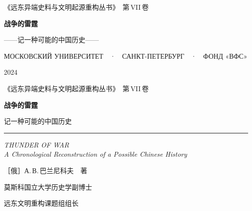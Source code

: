 \clearpage
\makeatletter\@mainmatterfalse\makeatother
{}
\pagestyle{frontmatterpage}

\thispagestyle{empty}
\begingroup
\centering
\vspace*{7mm}

{\sffamily\footnotesize\color{pencil}
《远东异端史料与文明起源重构丛书》\ 第\,VII\,卷\par}

\vspace{27mm}

{\fontsize{26pt}{34pt}\selectfont\bfseries 战争的雷霆\par}
\vspace{8mm}
{\large ——记一种可能的中国历史——\par}

\vfill

{\sffamily\footnotesize\color{pencil}
МОСКОВСКИЙ УНИВЕРСИТЕТ\ \ ·\ \ САНКТ-ПЕТЕРБУРГ\ \ ·\ \ ФОНД «ВФС»\par}
\vspace{4mm}
{\footnotesize\color{pencil} 2024\par}
\endgroup
\clearpage


\thispagestyle{empty}
\begingroup
\centering
\vspace*{3mm}

{\sffamily\footnotesize\color{pencil}
《远东异端史料与文明起源重构丛书》\ 第\,VII\,卷\par}

\vspace{17mm}
{\fontsize{31pt}{40pt}\selectfont\bfseries 战争的雷霆\par}
\vspace{6mm}
{\LARGE 记一种可能的中国历史\par}

\vspace{10mm}
{\color{rulegrey}\rule{46mm}{0.4pt}}
\vspace{10mm}

{\itshape\small\color{graphite}
THUNDER OF WAR\\[2pt]
A Chronological Reconstruction of a Possible Chinese History\par}

\vspace{18mm}

{\large ［俄］А.\,В.\,巴兰尼科夫\ \ 著\par}
\vspace{2mm}
{\small\color{graphite} 莫斯科国立大学历史学副博士\par}
\vspace{1mm}
{\small\color{graphite} 远东文明重构课题组组长\par}

